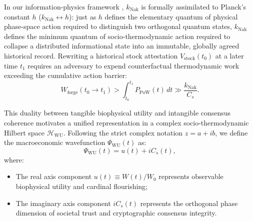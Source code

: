 \documentclass[aps,pre,twocolumn,10pt,superscriptaddress,amsmath,amssymb,amsfonts,floatfix,showkeys]{revtex4-2}
\begin{document}
In our information-physics framework \cite{RanaoraYii2026, RanaoraThermo2026}, $k_{\text{Nak}}$ is formally assimilated to Planck's constant $h$ ($k_{\text{Nak}} \leftrightarrow h$): just as $h$ defines the elementary quantum of physical phase-space action required to distinguish two orthogonal quantum states, $k_{\text{Nak}}$ defines the minimum quantum of socio-thermodynamic action required to collapse a distributed informational state into an immutable, globally agreed historical record. Rewriting a historical stock attestation $V_{\text{stock}}(t_0)$ at a later time $t_1$ requires an adversary to expend counterfactual thermodynamic work exceeding the cumulative action barrier:
\begin{equation}
    W_{\text{forge}}(t_0 \to t_1) > \int_{t_0}^{t_1} P_{\text{PoW}}(t)\,dt \gg \frac{k_{\text{Nak}}}{C_s}.
    \label{eq:forgery_barrier}
\end{equation}

This duality between tangible biophysical utility and intangible consensus coherence motivates a unified representation in a complex socio-thermodynamic Hilbert space $\mathcal{H}_{\text{WU}}$. Following the strict complex notation $z = a + ib$, we define the macroeconomic wavefunction $\Psi_{\text{WU}}(t)$ as:
\begin{equation}
    \Psi_{\text{WU}}(t) = u(t) + i C_s(t),
    \label{eq:complex_wavefunction}
\end{equation}
where:
\begin{itemize}
    \item The real axis component $u(t) \equiv W(t) / W_0$ represents observable biophysical utility and cardinal flourishing;
    \item The imaginary axis component $i C_s(t)$ represents the orthogonal phase dimension of societal trust and cryptographic consensus integrity.
\end{itemize}
\end{document}
